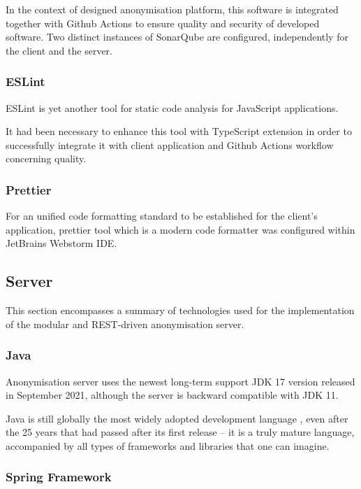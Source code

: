 \documentclass[a4paper,twoside,12pt]{book}
\begin{document}
In the context of designed anonymisation platform, this software is integrated together with Github Actions to ensure quality and security of developed software. Two distinct instances of SonarQube are configured, independently for the client and the server.

\subsubsection{ESLint}

ESLint is yet another tool for static code analysis for JavaScript applications.

It had been necessary to enhance this tool with TypeScript extension in order to successfully integrate it with client application and Github Actions workflow concerning quality.

\subsubsection{Prettier}

For an unified code formatting standard to be established for the client's application, prettier tool which is a modern code formatter was configured within JetBrains Webstorm IDE.

\subsection{Server}

This section encompasses a summary of technologies used for the implementation of the modular and REST-driven anonymisation server.

\subsubsection{Java}

Anonymisation server uses the newest long-term support JDK 17 version released in September 2021, although the server is backward compatible with JDK 11.

Java is still globally the most widely adopted development language \cite{bib:java25years}, even after the 25 years that had passed after its first release – it is a truly mature language, accompanied by all types of frameworks and libraries that one can imagine.

\subsubsection{Spring Framework}
\end{document}
